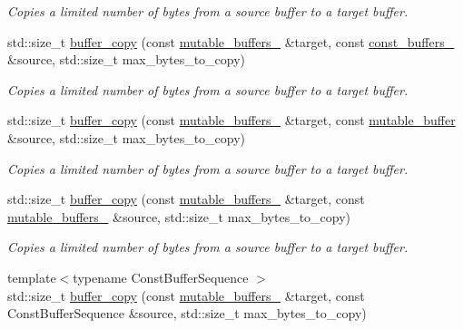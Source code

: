 \begin{DoxyCompactItemize}
\begin{DoxyCompactList}\small\item\em Copies a limited number of bytes from a source buffer to a target buffer. \end{DoxyCompactList}\item 
std\+::size\+\_\+t \hyperlink{group__buffer__copy_ga4d26475b811386a5c1cfc779368dd56d}{buffer\+\_\+copy} (const \hyperlink{classasio_1_1mutable__buffers__1}{mutable\+\_\+buffers\+\_} \&target, const \hyperlink{classasio_1_1const__buffers__1}{const\+\_\+buffers\+\_} \&source, std\+::size\+\_\+t max\+\_\+bytes\+\_\+to\+\_\+copy)
\begin{DoxyCompactList}\small\item\em Copies a limited number of bytes from a source buffer to a target buffer. \end{DoxyCompactList}\item 
std\+::size\+\_\+t \hyperlink{group__buffer__copy_ga39411f1f8eae62b00cfc5fdec52e62ef}{buffer\+\_\+copy} (const \hyperlink{classasio_1_1mutable__buffers__1}{mutable\+\_\+buffers\+\_} \&target, const \hyperlink{classasio_1_1mutable__buffer}{mutable\+\_\+buffer} \&source, std\+::size\+\_\+t max\+\_\+bytes\+\_\+to\+\_\+copy)
\begin{DoxyCompactList}\small\item\em Copies a limited number of bytes from a source buffer to a target buffer. \end{DoxyCompactList}\item 
std\+::size\+\_\+t \hyperlink{group__buffer__copy_ga3ec7ca61beddb66bdf2c1b9950e5ef25}{buffer\+\_\+copy} (const \hyperlink{classasio_1_1mutable__buffers__1}{mutable\+\_\+buffers\+\_} \&target, const \hyperlink{classasio_1_1mutable__buffers__1}{mutable\+\_\+buffers\+\_} \&source, std\+::size\+\_\+t max\+\_\+bytes\+\_\+to\+\_\+copy)
\begin{DoxyCompactList}\small\item\em Copies a limited number of bytes from a source buffer to a target buffer. \end{DoxyCompactList}\item 
{\footnotesize template$<$typename Const\+Buffer\+Sequence $>$ }\\std\+::size\+\_\+t \hyperlink{group__buffer__copy_gaebf4f7f5d3db8dfaaeabd5d8bbfc3c30}{buffer\+\_\+copy} (const \hyperlink{classasio_1_1mutable__buffers__1}{mutable\+\_\+buffers\+\_} \&target, const Const\+Buffer\+Sequence \&source, std\+::size\+\_\+t max\+\_\+bytes\+\_\+to\+\_\+copy)
\item 

\end{DoxyCompactItemize}
